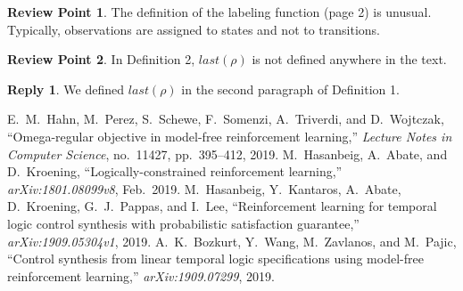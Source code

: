 \documentclass[10 pt, dvipdfmx]{article}
\theoremstyle{definition}
\newtheorem{review point}{Review Point}[section]
\newtheorem*{reply}{Reply}
\begin{document}
\begin{review point}
  The definition of the labeling function (page 2) is unusual. Typically, observations are assigned to states and not to transitions.
\end{review point}

\begin{review point}
  In Definition 2, $last(\rho)$ is not defined anywhere in the text.
\end{review point}

\begin{reply}
  We defined $last(\rho)$ in the second paragraph of Definition 1.
\end{reply}
\begin{thebibliography}{99}
E.\ M.\ Hahn, M.\ Perez, S.\ Schewe, F.\ Somenzi, A.\ Triverdi, and D.\ Wojtczak,
``Omega-regular objective in model-free reinforcement learning,''
\textit{Lecture Notes in Computer Science}, no.\ 11427, pp.\ 395--412, 2019.
M.\ Hasanbeig, A.\ Abate, and D.\ Kroening,
``Logically-constrained reinforcement learning,'' \textit{arXiv:1801.08099v8}, Feb.\ 2019.
M.\ Hasanbeig, Y.\ Kantaros, A.\ Abate, D.\ Kroening, G.\ J.\ Pappas, and I.\ Lee,
``Reinforcement learning for temporal logic control synthesis with probabilistic satisfaction guarantee,''
\textit{arXiv:1909.05304v1}, 2019.
A.\ K.\ Bozkurt, Y.\ Wang, M.\ Zavlanos, and M.\ Pajic,
``Control synthesis from linear temporal logic specifications using model-free reinforcement learning,''
\textit{arXiv:1909.07299}, 2019.
\end{thebibliography}
\end{document}
